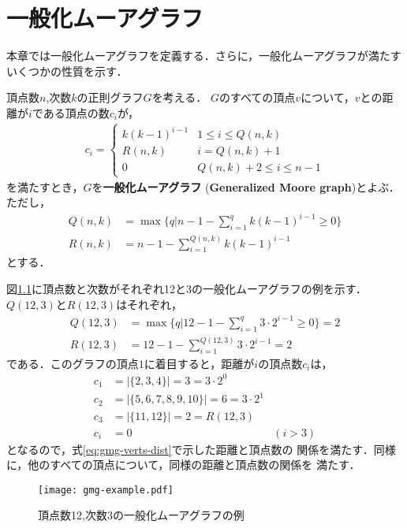 
\chapter{一般化ムーアグラフ}
\label{chap:generalized-moore-graph}
本章では一般化ムーアグラフを定義する．さらに，一般化ムーアグラフが満たす
いくつかの性質を示す．
\begin{definition}\rm
  \label{def:generalized-moore-graph}
  頂点数$n$,次数$k$の正則グラフ$G$を考える．
  $G$のすべての頂点$v$について，$v$との距離が$i$である頂点の数$c_i$が，
  \begin{equation}
    \label{eq:gmg-verts-dist}
    \begin{aligned}
      c_i =
      \begin{cases}
        k(k-1)^{i-1} & 1\leq i\leq Q(n,k) \\
        R(n,k) & i = Q(n,k)+1 \\
        0 & Q(n,k)+2\leq i \leq n-1
      \end{cases}
    \end{aligned}
  \end{equation}
  を満たすとき，$G$を\textbf{一般化ムーアグラフ}
  (\textbf{Generalized Moore graph})とよぶ．ただし，
  \begin{align}
    Q(n,k)&=\max\{q|n-1-\sum_{i=1}^{q}k(k-1)^{i-1}\geq 0\}\label{eq:gmg-q} \\
    R(n,k)&=n-1-\sum_{i=1}^{Q(n,k)}k(k-1)^{i-1}\label{eq:gmg-r}
  \end{align}
  とする．
\end{definition}
\begin{example}\rm
  図\ref{fig:gmg-example}に頂点数と次数がそれぞれ12と3の一般化ムーアグラフの例を示す．
  $Q(12,3)$と$R(12,3)$はそれぞれ，
  \begin{align*}
    Q(12,3) &= \max\{q | 12-1-\sum_{i=1}^{q}3\cdot2^{i-1} \geq 0\} = 2 \\
    R(12,3) &= 12 - 1 - \sum_{i=1}^{Q(12,3)}3\cdot2^{i-1} = 2
  \end{align*}
  である．このグラフの頂点$1$に着目すると，距離が$i$の頂点数$c_i$は，
  \begin{align*}
    c_1&= |\{2,3,4\}| = 3 = 3\cdot2^0 & \\
    c_2&= |\{5,6,7,8,9,10\}| = 6 = 3\cdot2^1 & \\
    c_3&= |\{11,12\}| = 2 = R(12,3) & \\
    c_i&= 0 & (i>3)
  \end{align*}
  となるので，式\eqref{eq:gmg-verts-dist}で示した距離と頂点数の
  関係を満たす．同様に，他のすべての頂点について，同様の距離と頂点数の関係を
  満たす．
  \begin{figure}
    \centering
    \texttt{[image: gmg-example.pdf]}
    \caption{頂点数12,次数3の一般化ムーアグラフの例}
    \label{fig:gmg-example}
  \end{figure}
\end{example}

